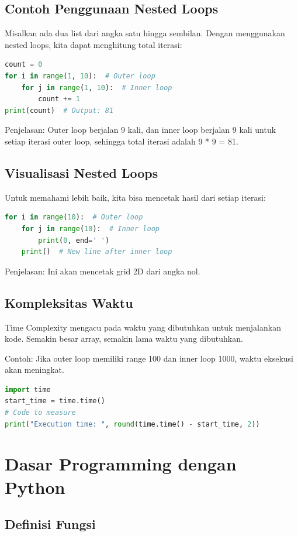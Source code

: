 \documentclass{article}
\begin{document}
\subsection{Contoh Penggunaan Nested Loops}
Misalkan ada dua list dari angka satu hingga sembilan. Dengan menggunakan nested loops, kita dapat menghitung total iterasi:
\begin{lstlisting}[language=Python, caption={}, captionpos=b]
count = 0
for i in range(1, 10):  # Outer loop
    for j in range(1, 10):  # Inner loop
        count += 1
print(count)  # Output: 81
\end{lstlisting}

Penjelasan: Outer loop berjalan 9 kali, dan inner loop berjalan 9 kali untuk setiap iterasi outer loop, sehingga total iterasi adalah 9 * 9 = 81.

\subsection{Visualisasi Nested Loops}
Untuk memahami lebih baik, kita bisa mencetak hasil dari setiap iterasi:
\begin{lstlisting}[language=Python, caption={}, captionpos=b]
for i in range(10):  # Outer loop
    for j in range(10):  # Inner loop
        print(0, end=' ')
    print()  # New line after inner loop
\end{lstlisting}

Penjelasan: Ini akan mencetak grid 2D dari angka nol.

\subsection{Kompleksitas Waktu}
Time Complexity mengacu pada waktu yang dibutuhkan untuk menjalankan kode. Semakin besar array, semakin lama waktu yang dibutuhkan.

Contoh: Jika outer loop memiliki range 100 dan inner loop 1000, waktu eksekusi akan meningkat.
\begin{lstlisting}[language=Python, caption={}, captionpos=b]
import time
start_time = time.time()
# Code to measure
print("Execution time: ", round(time.time() - start_time, 2))
\end{lstlisting}

\newpage

\section{Dasar Programming dengan Python}
\subsection{Definisi Fungsi}
\end{document}
